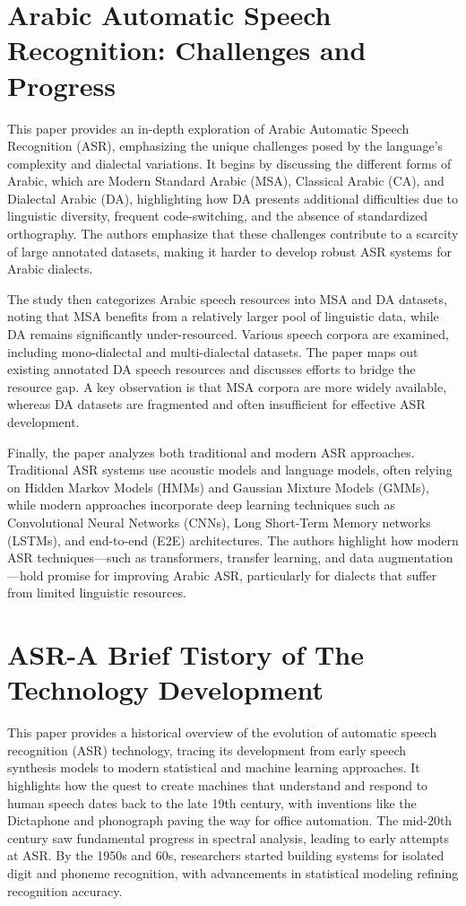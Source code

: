\section{Arabic Automatic Speech Recognition: Challenges and Progress}
This paper provides an in-depth exploration of Arabic Automatic Speech Recognition (ASR), emphasizing the unique challenges posed by the language's complexity and dialectal variations. It begins by discussing the different forms of Arabic, which are Modern Standard Arabic (MSA), Classical Arabic (CA), and Dialectal Arabic (DA), highlighting how DA presents additional difficulties due to linguistic diversity, frequent code-switching, and the absence of standardized orthography. The authors emphasize that these challenges contribute to a scarcity of large annotated datasets, making it harder to develop robust ASR systems for Arabic dialects.

The study then categorizes Arabic speech resources into MSA and DA datasets, noting that MSA benefits from a relatively larger pool of linguistic data, while DA remains significantly under-resourced. Various speech corpora are examined, including mono-dialectal and multi-dialectal datasets. The paper maps out existing annotated DA speech resources and discusses efforts to bridge the resource gap. A key observation is that MSA corpora are more widely available, whereas DA datasets are fragmented and often insufficient for effective ASR development.

Finally, the paper analyzes both traditional and modern ASR approaches. Traditional ASR systems use acoustic models and language models, often relying on Hidden Markov Models (HMMs) and Gaussian Mixture Models (GMMs), while modern approaches incorporate deep learning techniques such as Convolutional Neural Networks (CNNs), Long Short-Term Memory networks (LSTMs), and end-to-end (E2E) architectures. The authors highlight how modern ASR techniques—such as transformers, transfer learning, and data augmentation—hold promise for improving Arabic ASR, particularly for dialects that suffer from limited linguistic resources.

\section{ASR-A Brief Tistory of The Technology Development}
This paper provides a historical overview of the evolution of automatic speech recognition (ASR) technology, tracing its development from early speech synthesis models to modern statistical and machine learning approaches. It highlights how the quest to create machines that understand and respond to human speech dates back to the late 19th century, with inventions like the Dictaphone and phonograph paving the way for office automation. The mid-20th century saw fundamental progress in spectral analysis, leading to early attempts at ASR. By the 1950s and 60s, researchers started building systems for isolated digit and phoneme recognition, with advancements in statistical modeling refining recognition accuracy.

